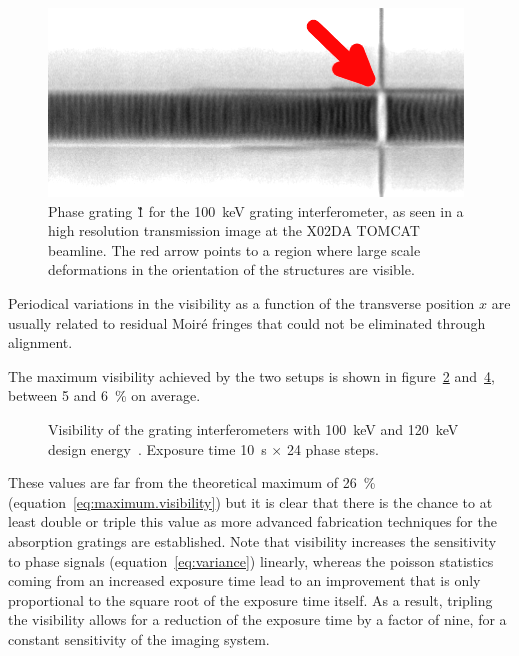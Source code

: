 \begin{figure}[htb]
    \centering
    \includegraphics[width=\textwidth]{gfx/mythen-edge-on/tomcat-grating.png}
    \caption[Beamline radiography of a phase grating.]{Phase grating \G1 for the \SI{100}{\kilo\eV} grating
interferometer, as seen in a high resolution transmission image at the X02DA
TOMCAT beamline. The red arrow points to a region where large scale
deformations in the orientation of the structures are visible.}
    \label{fig:defects-tomcat}
\end{figure}

Periodical variations in the visibility as a function of the transverse
position $x$ are usually related to residual Moir\'e fringes that could not
be eliminated through alignment. 

The maximum visibility achieved by the two setups is shown in 
figure~\ref{fig:visibility100} and~\ref{fig:visibility120}, between \num{5} and
\SI{6}{\percent} on average.

\begin{figure}[h!]
    \centering
    \begin{subfigure}[b]{.75\textwidth}
        \resizebox{\textwidth}{!}{}
        \caption{}
        \label{fig:visibility100}
    \end{subfigure}
    \begin{subfigure}[b]{.75\textwidth}
        \resizebox{\textwidth}{!}{}
        \caption{}
        \label{fig:visibility120}
    \end{subfigure}
    \caption{Visibility of the grating
        interferometers with
        \SI{100}{\kilo\eV} and \SI{120}{\kilo\eV} design
        energy~\parencite{galitesina}. Exposure time \SI{10}{\second}
        $\times$ \num{24} phase steps.}
\end{figure}

These values are far from the theoretical maximum of \SI{26}{\percent}
(equation~\ref{eq:maximum.visibility}) but it is clear that there is the
chance to at least double or triple this value as more advanced fabrication
techniques for the absorption gratings are established. Note that visibility
increases the sensitivity to phase signals (equation~\ref{eq:variance})
linearly, whereas the poisson statistics coming from an increased exposure
time lead to an improvement that is only proportional to the square root of
the exposure time itself. As a result, tripling the visibility allows for a
reduction of the exposure time by a factor of nine, for a constant
sensitivity of the imaging system.

